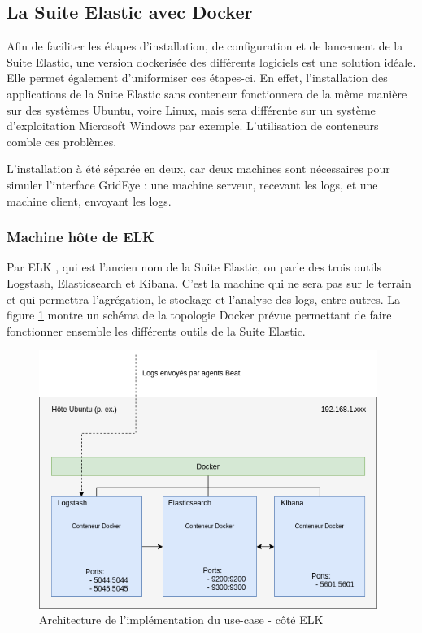 \documentclass[paper=a4, fontsize=11pt]{scrartcl}
\begin{document}
\subsection{La Suite Elastic avec Docker}
Afin de faciliter les étapes d'installation, de configuration et de lancement de la Suite Elastic, une version \og dockerisée \fg des différents logiciels est une solution idéale. Elle permet également d'uniformiser ces étapes-ci. En effet, l'installation des applications de la Suite Elastic sans conteneur fonctionnera de la même manière sur des systèmes Ubuntu, voire Linux, mais sera différente sur un système d'exploitation Microsoft Windows par exemple. L'utilisation de conteneurs comble ces problèmes.

L'installation à été séparée en deux, car deux machines sont nécessaires pour simuler l'interface GridEye : une machine serveur, recevant les logs, et une machine client, envoyant les logs.
\subsubsection{Machine hôte de \og ELK \fg}
Par \og ELK \fg, qui est l'ancien nom de la Suite Elastic, on parle des trois outils Logstash, Elasticsearch et Kibana. C'est la machine qui ne sera pas sur le terrain et qui permettra l'agrégation, le stockage et l'analyse des logs, entre autres.
La figure \ref{f-dockerTopology} montre un schéma de la topologie Docker prévue permettant de faire fonctionner ensemble les différents outils de la Suite Elastic.
\begin{figure}[H]
    \centering
    \includegraphics[width=11cm]{img/ElasticStack_docker_topology.png}
    \caption{Architecture de l'implémentation du use-case - côté \og ELK \fg}
    \label{f-dockerTopology}
\end{figure}
\end{document}
